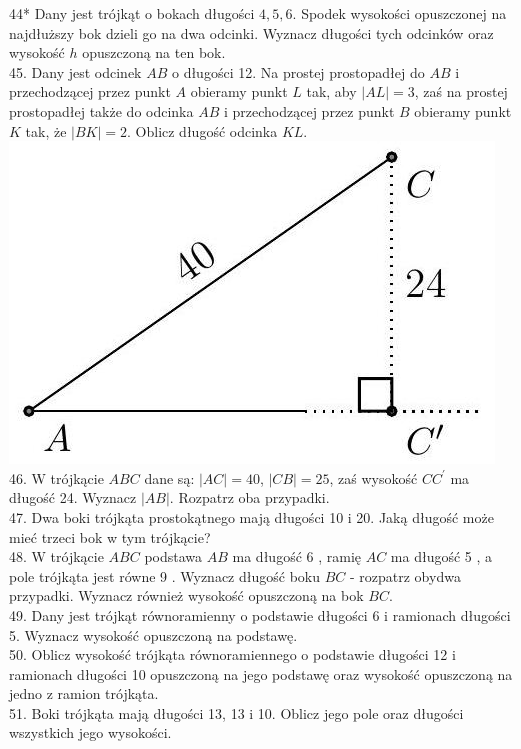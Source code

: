\documentclass[10pt]{article}
\begin{document}
44* Dany jest trójkąt o bokach długości \(4,5,6\). Spodek wysokości opuszczonej na najdłuższy bok dzieli go na dwa odcinki. Wyznacz długości tych odcinków oraz wysokość \(h\) opuszczoną na ten bok.\\
45. Dany jest odcinek \(A B\) o długości 12. Na prostej prostopadłej do \(A B\) i przechodzącej przez punkt \(A\) obieramy punkt \(L\) tak, aby \(|A L|=3\), zaś na prostej prostopadłej także do odcinka \(A B\) i przechodzącej przez punkt \(B\) obieramy punkt \(K\) tak, że \(|B K|=2\). Oblicz długość odcinka \(K L\).\\
\includegraphics[max width=\textwidth, center]{2024_11_21_71f62bd117d375398909g-129}\\
46. W trójkącie \(A B C\) dane są: \(|A C|=40\), \(|C B|=25\), zaś wysokość \(C C^{\prime}\) ma długość 24. Wyznacz \(|A B|\). Rozpatrz oba przypadki.\\
47. Dwa boki trójkąta prostokątnego mają długości 10 i 20. Jaką długość może mieć trzeci bok w tym trójkącie?\\
48. W trójkącie \(A B C\) podstawa \(A B\) ma długość 6 , ramię \(A C\) ma długość 5 , a pole trójkąta jest równe 9 . Wyznacz długość boku \(B C\) - rozpatrz obydwa przypadki. Wyznacz również wysokość opuszczoną na bok \(B C\).\\
49. Dany jest trójkąt równoramienny o podstawie długości 6 i ramionach długości 5. Wyznacz wysokość opuszczoną na podstawę.\\
50. Oblicz wysokość trójkąta równoramiennego o podstawie długości 12 i ramionach długości 10 opuszczoną na jego podstawę oraz wysokość opuszczoną na jedno z ramion trójkąta.\\
51. Boki trójkąta mają długości 13, 13 i 10. Oblicz jego pole oraz długości wszystkich jego wysokości.\\
\end{document}
